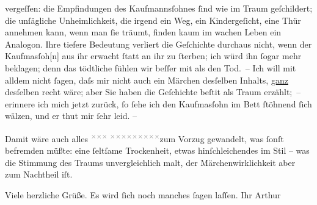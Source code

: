               vergeſſen: die Empfindungen des Kaufmannsſohnes{ }ſind wie im Traum geſchildert; die
               unſägliche Unheimlichkeit, die irgend ein Weg, ein Kindergeſicht, eine Thür annehmen
               kann, wenn man{ }ſie träumt, finden kaum im wachen Leben ein Analogon. Ihre tiefere
               Bedeutung verliert die Geſchichte durchaus nicht, wenn der Kaufma{\geminationn}sſoh{[}n{]} aus ihr erwacht{ }ſtatt an ihr zu{ }ſterben; ich
               würd ihn{ }ſogar mehr beklagen; denn das tödtliche fühlen wir beſſer mit als den Tod. –
               Ich will mit alldem {\pb}nicht{ }ſagen, daſs mir \introOben{}nicht\introOben{} auch ein Märchen desſelben Inhalts, \uline{ganz} desſelben{ }recht wäre; aber Sie
               haben die Geſchichte beſti{\geminationm}t als Traum erzählt; – erinnere ich mich jetzt zurück,{ }ſo{ }ſehe ich den Kaufma{\geminationn}sſohn im Bett ſtöhnend{ }ſich wälzen, und er thut mir{ }ſehr leid.
               –\pend
           
\pstart
           Damit wäre auch alles \substVorne{}\textsuperscript{\textcolor{gray}{×}\-\textcolor{gray}{×}\-\textcolor{gray}{×}{ }\textcolor{gray}{×}\-\textcolor{gray}{×}\-\textcolor{gray}{×}\-\textcolor{gray}{×}\-\textcolor{gray}{×}\-\textcolor{gray}{×}\-\textcolor{gray}{×}\-\textcolor{gray}{×}\-\textcolor{gray}{×}}\substDazwischen{}zum Vorzug gewandelt\substHinten{}, was{ }ſonſt befremden müßte: eine{ }ſeltſame Trockenheit, etwas
               hinſchleichendes im Stil – was die Stimmung des Traums unvergleichlich malt, der
               Märchenwirklichkeit aber zum Nachtheil iſt.\pend
           
\pstart
           Viele herzliche Grüße. Es wird{ }ſich noch manches{ }ſagen laſſen.\pend
           \pstart Ihr \spacefill\mbox{Arthur}\pend{}\endnumbering{}  \newcommand{\dateiname}{L00518}\newcommand{\titel}{Arthur Schnitzler an Hugo von Hofmannsthal, 26. 11. 1895}\newcommand{\editorInnen}{Martin Anton Müller und Gerd-Hermann Susen}
